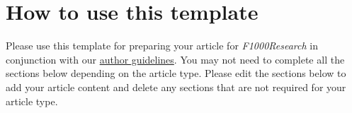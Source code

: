 \section*{How to use this template}
Please use this template for preparing your article for \textit{F1000Research} in conjunction with our \href{http://f1000research.com/author-guidelines}{author guidelines}.
You may not need to complete all the sections below depending on the article type. 
Please edit the sections below to add your article content and delete any sections that are not required for your article type. 